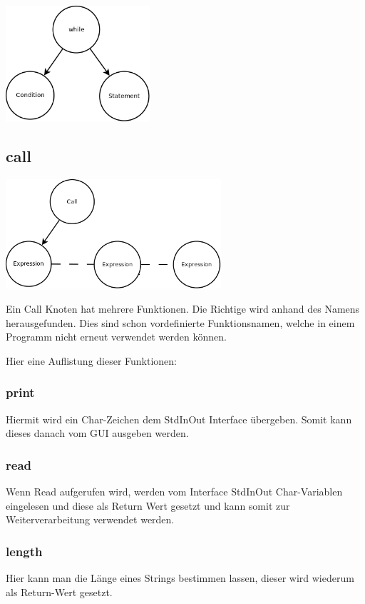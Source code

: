 \includegraphics[width=0.4\textwidth]{./media/images/interpreter/syntaxbaum/statements/while.png}

\subsection{call}
\includegraphics[width=0.6\textwidth]{./media/images/interpreter/syntaxbaum/statements/call.png}

Ein Call Knoten hat mehrere Funktionen. Die Richtige wird anhand des Namens herausgefunden. Dies sind schon vordefinierte
Funktionsnamen, welche in einem Programm nicht erneut verwendet werden können.

Hier eine Auflistung dieser Funktionen:

\subsubsection{print}
Hiermit wird ein Char-Zeichen dem StdInOut Interface übergeben. Somit kann dieses danach vom GUI ausgeben werden.

\subsubsection{read}
Wenn Read aufgerufen wird, werden vom Interface StdInOut Char-Variablen eingelesen und diese als Return Wert gesetzt und kann somit zur Weiterverarbeitung verwendet werden.

\subsubsection{length}
Hier kann man die Länge eines Strings bestimmen lassen, dieser wird wiederum als Return-Wert gesetzt.

